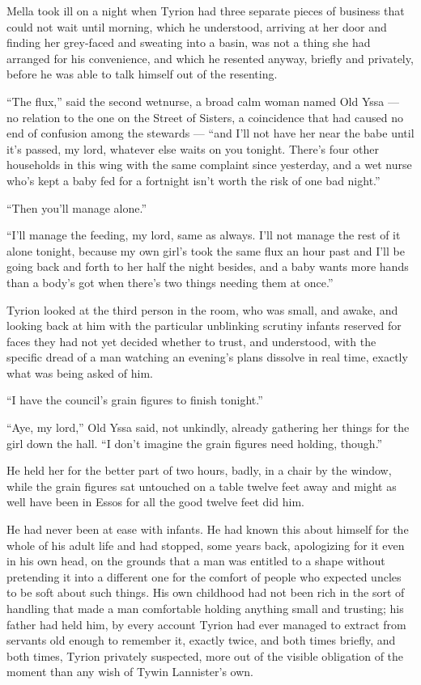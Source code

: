Mella took ill on a night when Tyrion had three separate pieces of business that could not wait until morning, which he understood, arriving at her door and finding her grey-faced and sweating into a basin, was not a thing she had arranged for his convenience, and which he resented anyway, briefly and privately, before he was able to talk himself out of the resenting.

“The flux,” said the second wetnurse, a broad calm woman named Old Yssa — no relation to the one on the Street of Sisters, a coincidence that had caused no end of confusion among the stewards — “and I’ll not have her near the babe until it’s passed, my lord, whatever else waits on you tonight. There’s four other households in this wing with the same complaint since yesterday, and a wet nurse who’s kept a baby fed for a fortnight isn’t worth the risk of one bad night.”

“Then you’ll manage alone.”

“I’ll manage the feeding, my lord, same as always. I’ll not manage the rest of it alone tonight, because my own girl’s took the same flux an hour past and I’ll be going back and forth to her half the night besides, and a baby wants more hands than a body’s got when there’s two things needing them at once.”

Tyrion looked at the third person in the room, who was small, and awake, and looking back at him with the particular unblinking scrutiny infants reserved for faces they had not yet decided whether to trust, and understood, with the specific dread of a man watching an evening’s plans dissolve in real time, exactly what was being asked of him.

“I have the council’s grain figures to finish tonight.”

“Aye, my lord,” Old Yssa said, not unkindly, already gathering her things for the girl down the hall. “I don’t imagine the grain figures need holding, though.”

\sceneBreak

He held her for the better part of two hours, badly, in a chair by the window, while the grain figures sat untouched on a table twelve feet away and might as well have been in Essos for all the good twelve feet did him.

He had never been at ease with infants. He had known this about himself for the whole of his adult life and had stopped, some years back, apologizing for it even in his own head, on the grounds that a man was entitled to a shape without pretending it into a different one for the comfort of people who expected uncles to be soft about such things. His own childhood had not been rich in the sort of handling that made a man comfortable holding anything small and trusting; his father had held him, by every account Tyrion had ever managed to extract from servants old enough to remember it, exactly twice, and both times briefly, and both times, Tyrion privately suspected, more out of the visible obligation of the moment than any wish of Tywin Lannister’s own.

